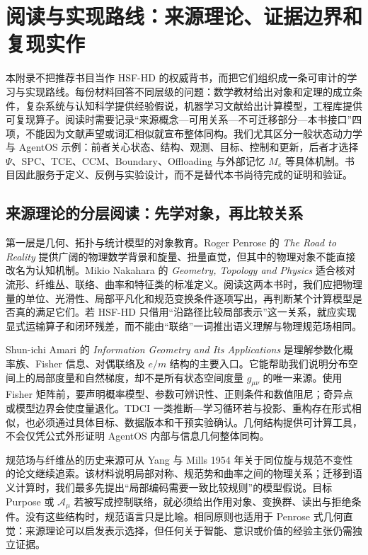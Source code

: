 \chapter{阅读与实现路线：来源理论、证据边界和复现实作}
\label{sec:section_9411}

本附录不把推荐书目当作 HSF-HD 的权威背书，而把它们组织成一条可审计的学习与实现路线。每份材料回答不同层级的问题：数学教材给出对象和定理的成立条件，复杂系统与认知科学提供经验假说，机器学习文献给出计算模型，工程库提供可复现算子。阅读时需要记录“来源概念—可用关系—不可迁移部分—本书接口”四项，不能因为文献声望或词汇相似就宣布整体同构。我们尤其区分一般状态动力学与 AgentOS 示例：前者关心状态、结构、观测、目标、控制和更新，后者才选择 $\Psi$、SPC、TCE、CCM、Boundary、Offloading 与外部记忆 $M_e$ 等具体机制。书目因此服务于定义、反例与实验设计，而不是替代本书尚待完成的证明和验证。

\section{来源理论的分层阅读：先学对象，再比较关系}

第一层是几何、拓扑与统计模型的对象教育。Roger Penrose 的 \textit{The Road to Reality} 提供广阔的物理数学背景和旋量、扭量直觉，但其中的物理对象不能直接改名为认知机制。Mikio Nakahara 的 \textit{Geometry, Topology and Physics} 适合核对流形、纤维丛、联络、曲率和特征类的标准定义。阅读这两本书时，我们应把物理量的单位、光滑性、局部平凡化和规范变换条件逐项写出，再判断某个计算模型是否真的满足它们。若 HSF-HD 只借用“沿路径比较局部表示”这一关系，就应实现显式运输算子和闭环残差，而不能由“联络”一词推出语义理解与物理规范场相同。

Shun-ichi Amari 的 \textit{Information Geometry and Its Applications} 是理解参数化概率族、Fisher 信息、对偶联络及 $e/m$ 结构的主要入口。它能帮助我们说明分布空间上的局部度量和自然梯度，却不是所有状态空间度量 $g_{\mu\nu}$ 的唯一来源。使用 Fisher 矩阵前，要声明概率模型、参数可辨识性、正则条件和数值阻尼；奇异点或模型边界会使度量退化。TDCI 一类推断—学习循环若与投影、重构存在形式相似，也必须通过具体目标、数据版本和干预实验确认。几何结构提供可计算工具，不会仅凭公式外形证明 AgentOS 内部与信息几何整体同构。

规范场与纤维丛的历史来源可从 Yang 与 Mills 1954 年关于同位旋与规范不变性的论文继续追索。该材料说明局部对称、规范势和曲率之间的物理关系；迁移到语义计算时，我们最多先提出“局部编码需要一致比较规则”的模型假说。目标 Purpose 或 $\mathcal A_\mu$ 若被写成控制联络，就必须给出作用对象、变换群、读出与拒绝条件。没有这些结构时，规范语言只是比喻。相同原则也适用于 Penrose 式几何直觉：来源理论可以启发表示选择，但任何关于智能、意识或价值的经验主张仍需独立证据。

